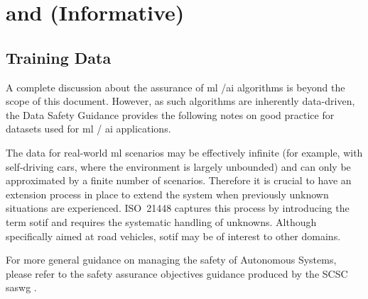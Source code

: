 %
%
\section{ and  (Informative)} \label{bkm:MachineLearning}



\subsection{ Training Data}
A complete discussion about the assurance of \gls{ml} /\gls{ai} algorithms is beyond the scope of this document.
However, as such algorithms are inherently data-driven, the Data Safety Guidance provides the following notes on good practice for \glspl{dataset} used for \gls{ml} / \gls{ai} applications.

The data for real-world \gls{ml} scenarios may be effectively infinite (for example, with self-driving cars, where the environment is largely unbounded) and can only be approximated by a finite number of scenarios.
Therefore it is crucial to have an extension process in place to extend the system when previously unknown situations are experienced. 
ISO~21448 \cite{citation:ISO21448} captures this process by introducing the term \gls{sotif} and requires the systematic handling of unknowns. Although specifically aimed at road vehicles, \gls{sotif} may be of interest to other domains.

For more general guidance on managing the safety of Autonomous Systems, please refer to the safety assurance objectives guidance produced by the SCSC \gls{saswg} \cite{citation:SASWG:Objectives}.

